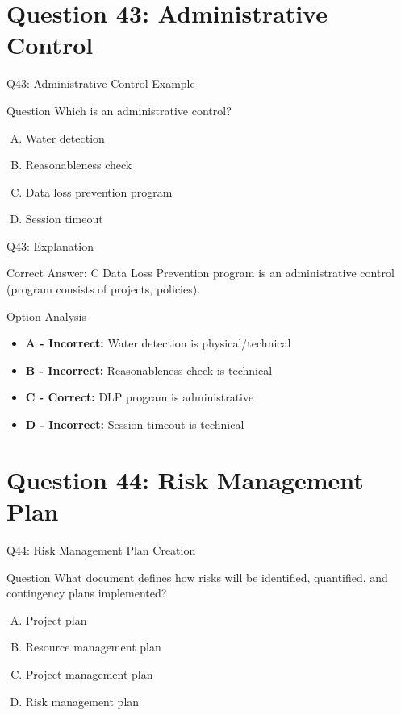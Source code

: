 \documentclass{beamer}
\begin{document}
	\section{Question 43: Administrative Control}
	
	\begin{frame}{Q43: Administrative Control Example}
		\begin{block}{Question}
			Which is an administrative control?
		\end{block}
		\begin{enumerate}[(A)]
			\item Water detection
			\item Reasonableness check
			\item Data loss prevention program
			\item Session timeout
		\end{enumerate}
	\end{frame}
	
	\begin{frame}{Q43: Explanation}
		\begin{block}{Correct Answer: C}
			Data Loss Prevention program is an administrative control (program consists of projects, policies).
		\end{block}
		\begin{block}{Option Analysis}
			\begin{itemize}
				\item \textbf{A - Incorrect:} Water detection is physical/technical
				\item \textbf{B - Incorrect:} Reasonableness check is technical
				\item \textbf{C - Correct:} DLP program is administrative
				\item \textbf{D - Incorrect:} Session timeout is technical
			\end{itemize}
		\end{block}
	\end{frame}
	
	\section{Question 44: Risk Management Plan}
	
	\begin{frame}{Q44: Risk Management Plan Creation}
		\begin{block}{Question}
			What document defines how risks will be identified, quantified, and contingency plans implemented?
		\end{block}
		\begin{enumerate}[(A)]
			\item Project plan
			\item Resource management plan
			\item Project management plan
			\item Risk management plan
		\end{enumerate}
	\end{frame}
	
\end{document}
